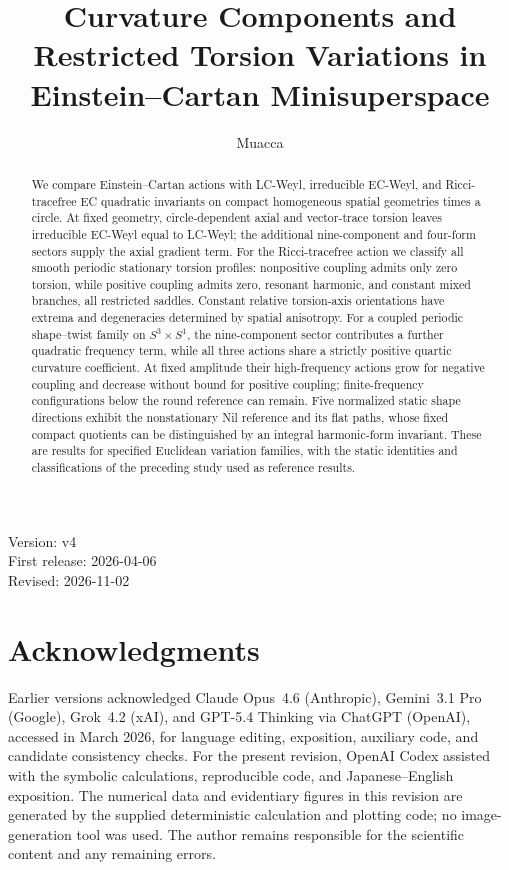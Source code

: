 \documentclass[11pt,a4paper]{article}
\title{Curvature Components and Restricted Torsion Variations in Einstein--Cartan Minisuperspace}
\author{Muacca}
\date{}
\begin{document}
\maketitle
\begin{center}Version: v4\\First release: 2026-04-06\\Revised: 2026-11-02\end{center}
\begin{abstract}
We compare Einstein--Cartan actions with LC-Weyl, irreducible EC-Weyl,
and Ricci-tracefree EC quadratic invariants on compact homogeneous spatial
geometries times a circle. At fixed geometry, circle-dependent axial and
vector-trace torsion leaves irreducible EC-Weyl equal to LC-Weyl; the additional
nine-component and four-form sectors supply the axial gradient term.
For the Ricci-tracefree action we classify all smooth periodic stationary
torsion profiles: nonpositive coupling admits only zero torsion, while
positive coupling admits zero,
resonant harmonic, and constant mixed branches, all restricted saddles.
Constant relative torsion-axis orientations have extrema and degeneracies
determined by spatial anisotropy. For a coupled periodic shape--twist family
on $S^3\times S^1$, the nine-component sector contributes a further quadratic
frequency term, while all three actions share a strictly positive quartic
curvature coefficient. At fixed amplitude their high-frequency actions grow
for negative coupling and decrease without bound for positive coupling;
finite-frequency configurations below the round reference can remain.
Five normalized static shape directions exhibit the nonstationary Nil
reference and its flat paths, whose fixed compact quotients can be distinguished
by an integral harmonic-form invariant. These are results for specified
Euclidean variation families, with the static identities and classifications
of the preceding study used as reference results.
\end{abstract}







\section*{Acknowledgments}
Earlier versions acknowledged Claude Opus~4.6 (Anthropic), Gemini~3.1 Pro
(Google), Grok~4.2 (xAI), and GPT-5.4 Thinking via ChatGPT (OpenAI), accessed
in March 2026, for language editing, exposition, auxiliary code, and candidate
consistency checks. For the present revision, OpenAI Codex assisted with the
symbolic calculations, reproducible code, and Japanese--English exposition.
The numerical data and evidentiary figures in this revision are generated by
the supplied deterministic calculation and plotting code; no image-generation
tool was used. The author remains responsible for the scientific content and
any remaining errors.
\end{document}
